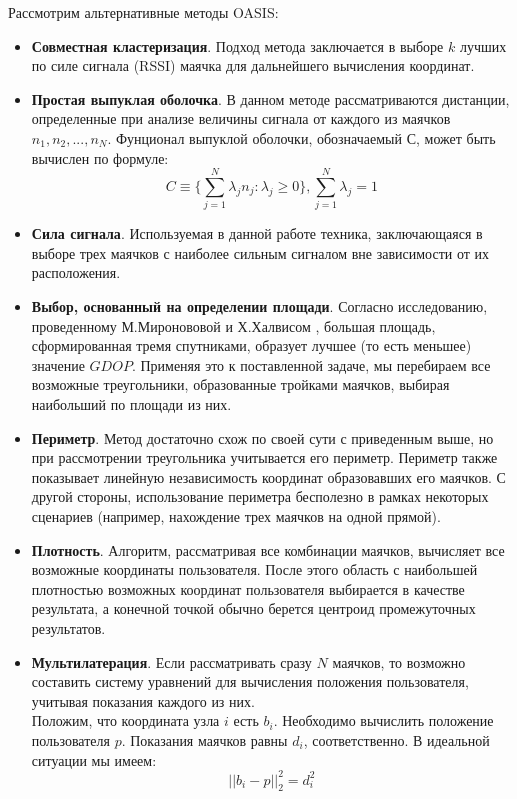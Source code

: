 Рассмотрим альтернативные методы OASIS:
\begin{itemize}
    \item
    \textbf{Совместная кластеризация}. Подход метода заключается в выборе $k$ лучших по силе сигнала (RSSI) маячка для дальнейшего вычисления координат.
    \item
    \textbf{Простая выпуклая оболочка}. В данном методе рассматриваются дистанции, определенные при анализе величины сигнала от каждого из маячков $n_1, n_2, ..., n_N$. Фунционал выпуклой оболочки, обозначаемый С, может быть вычислен по формуле:
    \[
        C \equiv \{ \sum_{j=1}^N \lambda_j n_j : \lambda_j \geq 0 \}, \sum_{j=1}^N \lambda_j = 1
    \]
    \item
    \textbf{Сила сигнала}. Используемая в данной работе техника, заклю\-чаю\-щая\-ся в выборе трех маячков с наиболее сильным сигналом вне зависимости от их расположения.
    \item
    \textbf{Выбор, основанный на определении площади}. Согласно исследованию, проведенному М.Миронововой и Х.Халвисом \cite{mironovova2011calculation}, большая площадь, сформированная тремя спутниками, образует лучшее (то есть меньшее) значение $GDOP$. Применяя это к поставленной задаче, мы перебираем все возможные треугольники, образованные тройками маячков, выбирая наибольший по площади из них.
    \item
    \textbf{Периметр}. Метод достаточно схож по своей сути с приведенным выше, но при рассмотрении треугольника учитывается его периметр. Периметр также показывает линейную независимость координат образовавших его маячков. С другой стороны, использование периметра бесполезно в рамках некоторых сценариев (например, нахождение трех маячков на одной прямой).
    \item
    \textbf{Плотность}. Алгоритм, рассматривая все комбинации маячков, вычисляет все возможные координаты пользователя. После этого область с наибольшей плотностью возможных координат пользователя выбирается в качестве результата, а конечной точкой обычно берется центроид промежуточных результатов.
    \item
    \textbf{Мультилатерация}. Если рассматривать сразу $N$ маячков, то возможно составить систему уравнений для вычисления положения пользователя, учитывая показания каждого из них. \\
    Положим, что координата узла $i$ есть $b_i$. Необходимо вычислить положение пользователя $p$. Показания маячков равны $d_i$, соответственно. В идеальной ситуации мы имеем:
    \[
        || b_i - p ||^2_2=d_i^2
\]
\end{itemize}
